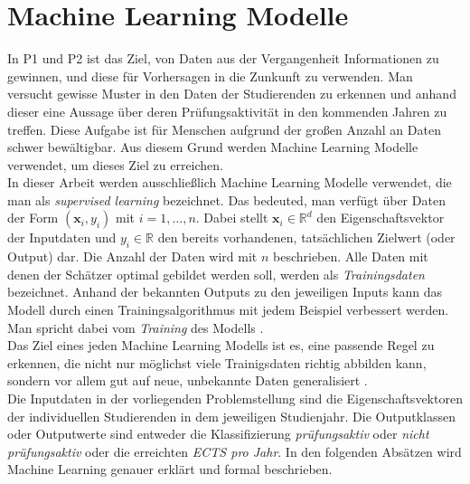 

\section{Machine Learning Modelle}
\label{sec:ml}

In P1 und P2 ist das Ziel, von Daten aus der Vergangenheit Informationen zu gewinnen, und diese f\"ur Vorhersagen in die Zunkunft zu verwenden.
Man versucht gewisse Muster in den Daten der Studierenden zu erkennen und anhand dieser eine Aussage \"uber deren Pr\"ufungsaktivit\"at in den kommenden Jahren zu treffen.
Diese Aufgabe ist f\"ur Menschen aufgrund der gro{\ss}en Anzahl an Daten schwer bew\"altigbar. Aus diesem Grund werden Machine Learning Modelle verwendet,
um dieses Ziel zu erreichen. \\

In dieser Arbeit werden ausschlie{\ss}lich Machine Learning Modelle verwendet, die man als \textit{supervised learning} bezeichnet.
Das bedeuted, man verf\"ugt \"uber Daten der Form $(\mathbf{x}_i, y_i)$ mit $i = 1,\dots,n$. Dabei stellt $\mathbf{x}_i \in \mathbb{R}^d$ den Eigenschaftsvektor
der Inputdaten und $y_i \in \mathbb{R}$ den bereits vorhandenen, tats\"achlichen Zielwert (oder Output) dar. Die Anzahl der Daten wird mit $n$ beschrieben. Alle Daten mit denen der
Sch\"atzer optimal gebildet werden soll, werden als \textit{Trainingsdaten} bezeichnet.
Anhand der bekannten Outputs zu den jeweiligen Inputs kann das Modell durch einen Trainingsalgorithmus mit jedem Beispiel verbessert werden.
Man spricht dabei vom \textit{Training} des Modells \cite[Seiten 19 bis 25]{shalev}. \\

Das Ziel eines jeden Machine Learning Modells ist es, eine passende Regel zu erkennen, die nicht nur m\"oglichst viele Trainigsdaten richtig abbilden kann, sondern vor allem
gut auf neue, unbekannte Daten generalisiert \cite[Seite 371]{strang}. \\

Die Inputdaten in der vorliegenden Problemstellung sind die Eigenschaftsvektoren der individuellen Studierenden in dem jeweiligen Studienjahr. Die Outputklassen oder
Outputwerte sind entweder die Klassifizierung \textit{pr\"ufungsaktiv} oder \textit{nicht pr\"ufungsaktiv} oder die erreichten \textit{ECTS pro Jahr}.
In den folgenden Abs\"atzen wird Machine Learning genauer erkl\"art und formal beschrieben. \\



